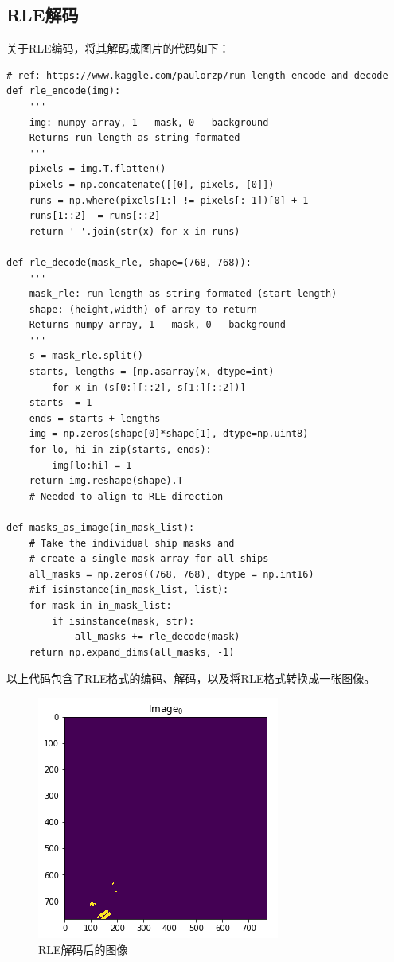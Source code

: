 \subsection{RLE解码}

关于RLE编码，将其解码成图片的代码如下：

\begin{lstlisting}
# ref: https://www.kaggle.com/paulorzp/run-length-encode-and-decode
def rle_encode(img):
    '''
    img: numpy array, 1 - mask, 0 - background
    Returns run length as string formated
    '''
    pixels = img.T.flatten()
    pixels = np.concatenate([[0], pixels, [0]])
    runs = np.where(pixels[1:] != pixels[:-1])[0] + 1
    runs[1::2] -= runs[::2]
    return ' '.join(str(x) for x in runs)

def rle_decode(mask_rle, shape=(768, 768)):
    '''
    mask_rle: run-length as string formated (start length)
    shape: (height,width) of array to return 
    Returns numpy array, 1 - mask, 0 - background
    '''
    s = mask_rle.split()
    starts, lengths = [np.asarray(x, dtype=int)
        for x in (s[0:][::2], s[1:][::2])]
    starts -= 1
    ends = starts + lengths
    img = np.zeros(shape[0]*shape[1], dtype=np.uint8)
    for lo, hi in zip(starts, ends):
        img[lo:hi] = 1
    return img.reshape(shape).T
    # Needed to align to RLE direction

def masks_as_image(in_mask_list):
    # Take the individual ship masks and
    # create a single mask array for all ships
    all_masks = np.zeros((768, 768), dtype = np.int16)
    #if isinstance(in_mask_list, list):
    for mask in in_mask_list:
        if isinstance(mask, str):
            all_masks += rle_decode(mask)
    return np.expand_dims(all_masks, -1)
\end{lstlisting}

以上代码包含了RLE格式的编码、解码，以及将RLE格式转换成一张图像。

\begin{figure}[htbp]
\centering
\includegraphics[width=0.6\linewidth]{body/preprocessing_pic/1}
\caption{RLE解码后的图像}
\label{fig::preprocessing1}
\end{figure}

